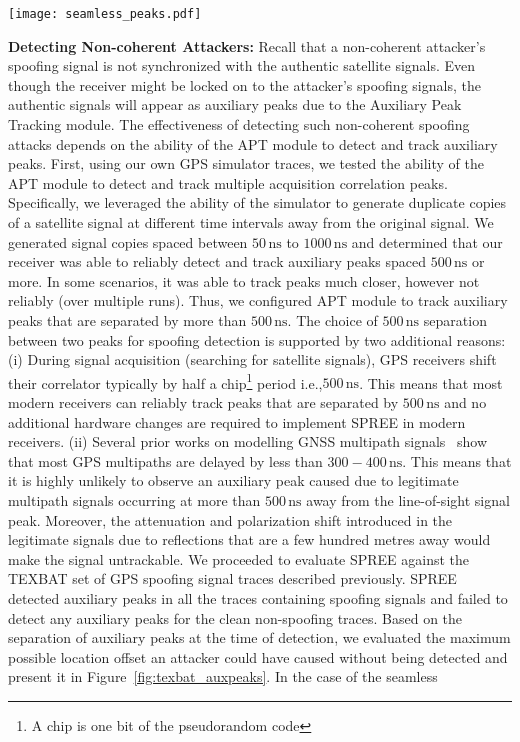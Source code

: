\documentclass[letterpaper,twocolumn,10pt]{article}
\newcommand{\ie}{i.e.,\xspace}
\newcommand{\unit}[1]{\ensuremath{\, \mathrm{#1}}}
\newcommand{\rxname}{SPREE\xspace}
\begin{document}
\begin{figure*}[t]
  \centering
  \texttt{[image: seamless\_peaks.pdf]}
  \caption{Detecting seamless take over attack. As the attacker begins to drift the spoofing signal away with the intention of changing the course of the ship, SPREE will detect the auxiliary peak produced by the legitimate satellite signal and rise an alarm.}
  \label{fig:seamless-takeover-detection}
\end{figure*}
\noindent\textbf{Detecting Non-coherent Attackers:} Recall that a non-coherent attacker's spoofing signal is not synchronized with the authentic satellite signals. Even though the receiver might be locked on to the attacker's spoofing signals, the authentic signals will appear as auxiliary peaks due to the Auxiliary Peak Tracking module. The effectiveness of detecting such non-coherent spoofing attacks depends on the ability of the APT module to detect and track auxiliary peaks. First, using our own GPS simulator traces, we tested the ability of the APT module to detect and track multiple acquisition correlation peaks. Specifically, we leveraged the ability of the simulator to generate duplicate copies of a satellite signal at different time intervals away from the original signal. We generated signal copies spaced between $50\unit{ns}$ to $1000\unit{ns}$ and determined that our receiver was able to reliably detect and track auxiliary peaks spaced $500\unit{ns}$ or more. In some scenarios, it was able to track peaks much closer, however not reliably (over multiple runs). Thus, we configured APT module to track auxiliary peaks that are separated by more than $500\unit{ns}$. The choice of $500\unit{ns}$ separation between two peaks for spoofing detection is supported by two additional reasons: (i) During signal acquisition (searching for satellite signals), GPS receivers shift their correlator typically by half a chip\footnote{A chip is one bit of the pseudorandom code} period \ie $500\unit{ns}$. This means that most modern receivers can reliably track peaks that are separated by $500\unit{ns}$ and no additional hardware changes are required to implement \rxname in modern receivers. (ii) Several prior works on modelling GNSS multipath signals~\cite{kong2011statistical,Braasch2001,lehner2005land,manandhar2006gps} show that most GPS multipaths are delayed by less than $300-400\unit{ns}$. This means that it is highly unlikely to observe an auxiliary peak caused due to legitimate multipath signals occurring at more than $500\unit{ns}$ away from the line-of-sight signal peak. Moreover, the attenuation and polarization shift introduced in the legitimate signals due to reflections that are a few hundred metres away would make the signal untrackable. We proceeded to evaluate \rxname against the TEXBAT set of GPS spoofing signal traces described previously. \rxname detected auxiliary peaks in all the traces containing spoofing signals and failed to detect any auxiliary peaks for the clean non-spoofing traces. Based on the separation of auxiliary peaks at the time of detection, we evaluated the maximum possible location offset an attacker could have caused without being detected and present it in Figure~\ref{fig:texbat_auxpeaks}. In the case of the seamless 
\end{document}
